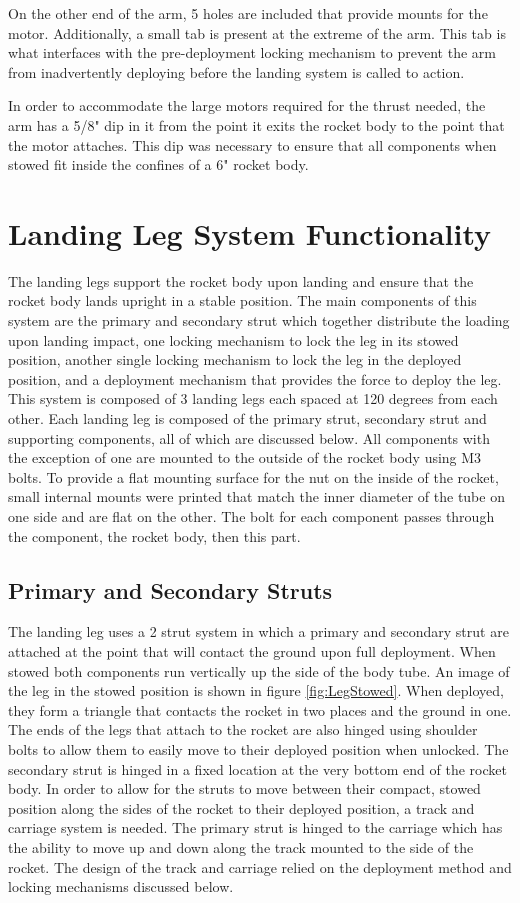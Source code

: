 On the other end of the arm, 5 holes are included that provide mounts for the motor. Additionally, a small tab is present at the extreme of the arm. This tab is what interfaces with the pre-deployment locking mechanism to prevent the arm from inadvertently deploying before the landing system is called to action.

In order to accommodate the large motors required for the thrust needed, the arm has a 5/8" dip in it from the point it exits the rocket body to the point that the motor attaches. This dip was necessary to ensure that all components when stowed fit inside the confines of a 6" rocket body. 

\section{Landing Leg System Functionality} 
The landing legs support the rocket body upon landing and ensure that the rocket body lands upright in a stable position. The main components of this system are the primary and secondary strut which together distribute the loading upon landing impact, one locking mechanism to lock the leg in its stowed position, another single locking mechanism to lock the leg in the deployed position, and a deployment mechanism that provides the force to deploy the leg. This system is composed of 3 landing legs each spaced at 120 degrees from each other. Each landing leg is composed of the primary strut, secondary strut and supporting components, all of which are discussed below. All components with the exception of one are mounted to the outside of the rocket body using M3 bolts. To provide a flat mounting surface for the nut on the inside of the rocket, small internal mounts were printed that match the inner diameter of the tube on one side and are flat on the other. The bolt for each component passes through the component, the rocket body, then this part.

\subsection{Primary and Secondary Struts}
The landing leg uses a 2 strut system in which a primary and secondary strut are attached at the point that will contact the ground upon full deployment. When stowed both components run vertically up the side of the body tube. An image of the leg in the stowed position is shown in figure \ref{fig:LegStowed}. When deployed, they form a triangle that contacts the rocket in two places and the ground in one. The ends of the legs that attach to the rocket are also hinged using shoulder bolts to allow them to easily move to their deployed position when unlocked. The secondary strut is hinged in a fixed location at the very bottom end of the rocket body. In order to allow for the struts to move between their compact, stowed position along the sides of the rocket to their deployed position, a track and carriage system is needed. The primary strut is hinged to the carriage which has the ability to move up and down along the track mounted to the side of the rocket. The design of the track and carriage relied on the deployment method and locking mechanisms discussed below.

